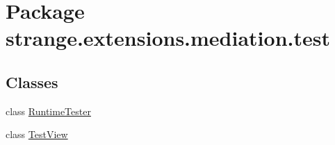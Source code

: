 \hypertarget{namespacestrange_1_1extensions_1_1mediation_1_1test}{\section{Package strange.\-extensions.\-mediation.\-test}
\label{namespacestrange_1_1extensions_1_1mediation_1_1test}
}
\subsection*{Classes}
\begin{DoxyCompactItemize}
\item 
class \hyperlink{classstrange_1_1extensions_1_1mediation_1_1test_1_1_runtime_tester}{Runtime\-Tester}
\item 
class \hyperlink{classstrange_1_1extensions_1_1mediation_1_1test_1_1_test_view}{Test\-View}
\end{DoxyCompactItemize}
